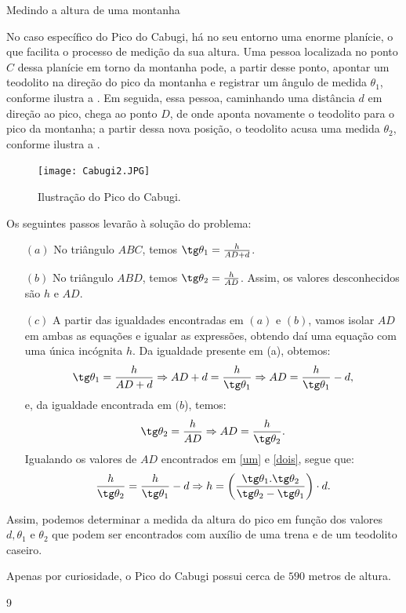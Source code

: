 \begin{answer}{Medindo a altura de uma montanha}
{
No caso específico do Pico do Cabugi, há no seu entorno uma enorme planície, o que facilita o processo de medição da sua altura.  Uma pessoa localizada no ponto $C$ dessa planície em torno da montanha pode, a partir desse ponto, apontar um teodolito na direção do pico da montanha e registrar um ângulo de medida $\theta_1$, conforme ilustra a . Em seguida, essa pessoa, caminhando uma distância $d$ em direção ao pico, chega ao ponto $D$, de onde aponta novamente o teodolito para o pico da montanha; a partir dessa nova posição, o teodolito acusa uma medida $\theta_2$, conforme ilustra a .
\begin{figure}[H]
    \centering
    \texttt{[image: Cabugi2.JPG]}
    \caption{Ilustração do Pico do Cabugi.}
    \label{Cabugi2}
\end{figure}

Os seguintes passos levarão à solução do problema:

\begin{itemize}
    \item[$(a)$] No triângulo $ABC$, temos $\tg\theta_1=\frac{h}{AD+d}$.
    \item[$(b)$] No triângulo $ABD$, temos $\tg\theta_2=\frac{h}{AD}$. Assim, os valores desconhecidos são $h$ e $AD$.
    \item[$(c)$] A partir das igualdades encontradas em $(a)$ e $(b)$, vamos isolar $AD$ em ambas as equações e igualar as expressões, obtendo daí uma equação com uma única incógnita $h$. Da igualdade presente em (a), obtemos:
\begin{equation}
\tg\theta_1=\frac{h}{AD+d} \Rightarrow AD+d=\frac{h}{\tg\theta_1}\Rightarrow AD=\frac{h}{\tg\theta_1}-d, \label{um}
\end{equation}
e, da igualdade encontrada em $(b$), temos:
\begin{equation}
\tg\theta_2=\frac{h}{AD} \Rightarrow AD=\frac{h}{\tg\theta_2}. \label{dois}
\end{equation}
Igualando os valores de $AD$ encontrados em \eqref{um} e \eqref{dois}, segue que:
$$\frac{h}{\tg\theta_2}=\frac{h}{\tg\theta_1}-d \Rightarrow h=\left(\frac{\tg\theta_1.\tg\theta_2}{\tg\theta_2-\tg\theta_1}\right)\cdot d.$$
\end{itemize}
    
Assim, podemos determinar a medida da altura do pico em função dos valores $d, \theta_1$  e $\theta_2$  que podem ser encontrados com auxílio de uma trena e de um teodolito caseiro.
    
Apenas por curiosidade, o Pico do Cabugi possui cerca de $590$ metros de altura.
}{9}
\end{answer}
